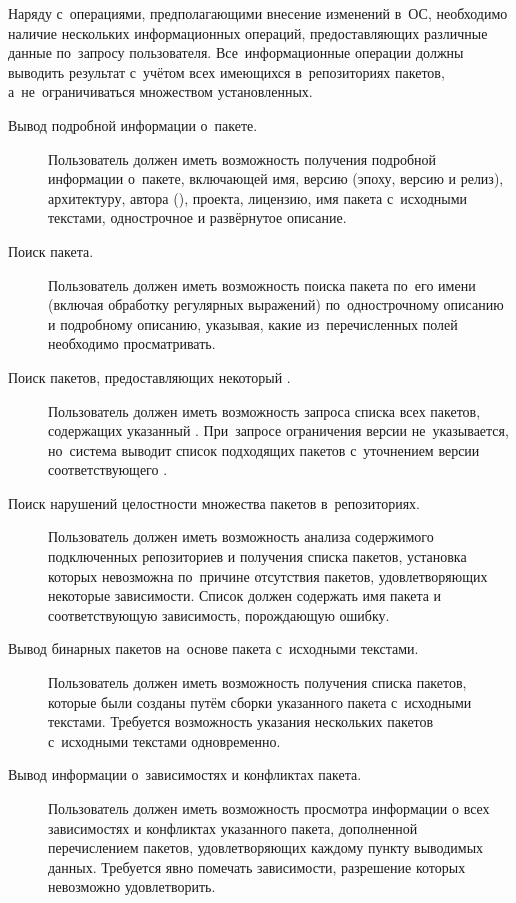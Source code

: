 Наряду с~операциями, предполагающими внесение изменений в~ОС,
необходимо наличие нескольких информационных операций,
предоставляющих различные данные по~запросу пользователя.
Все~информационные операции должны выводить результат с~учётом всех имеющихся в~репозиториях пакетов,
а~не~ограничиваться множеством установленных.

\begin{description}

\item[Вывод подробной информации о~пакете.]
Пользователь должен иметь возможность получения подробной информации о~пакете,
включающей имя, версию (эпоху, версию и релиз), архитектуру, автора (),  проекта,
лицензию, имя пакета с~исходными текстами, однострочное и развёрнутое описание.

\item[Поиск пакета.]
Пользователь должен иметь возможность поиска пакета по~его имени (включая обработку регулярных выражений)
по~однострочному описанию и подробному описанию, указывая, какие из~перечисленных полей необходимо просматривать.

\item[Поиск пакетов, предоставляющих некоторый .]
Пользователь должен иметь возможность запроса списка всех пакетов,
содержащих указанный .
При~запросе ограничения версии не~указывается,
но~система выводит список подходящих пакетов с~уточнением версии соответствующего .

\item[Поиск нарушений целостности множества пакетов в~репозиториях.]
Пользователь должен иметь возможность анализа содержимого подключенных репозиториев и получения списка пакетов,
установка которых невозможна по~причине отсутствия пакетов, удовлетворяющих некоторые зависимости.
Список должен содержать имя пакета и соответствующую зависимость, порождающую ошибку.

\item[Вывод бинарных пакетов на~основе пакета с~исходными текстами.]
Пользователь должен иметь возможность получения списка пакетов,
которые были созданы путём сборки указанного пакета с~исходными текстами.
Требуется возможность указания нескольких пакетов с~исходными текстами одновременно.

\item[Вывод информации о~зависимостях и конфликтах пакета.]
Пользователь должен иметь возможность просмотра информации 
о всех зависимостях и конфликтах указанного пакета, дополненной перечислением пакетов, удовлетворяющих каждому пункту выводимых данных.
Требуется явно помечать зависимости, разрешение которых невозможно удовлетворить.


\end{description}
